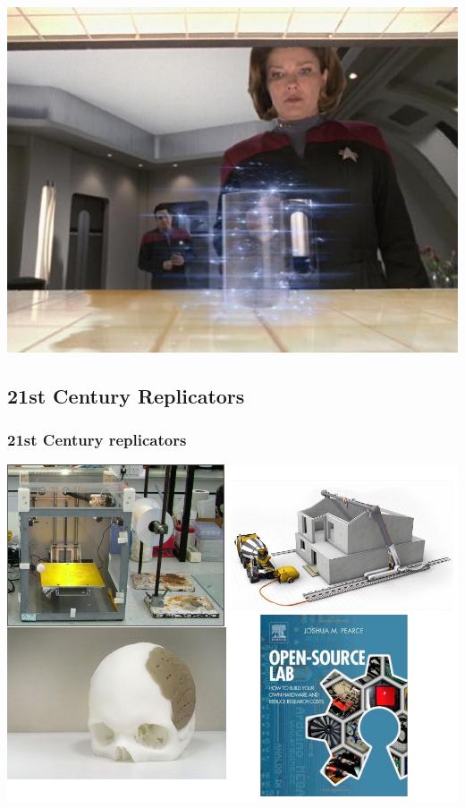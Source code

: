 \documentclass[10pt, compress]{beamer}
\begin{document}
\begin{frame}[fragile]
\begin{center}\includegraphics[scale=0.75]{Coffee_replicates_then_mug.jpg}\end{center}
\end{frame}

\subsection{21st Century Replicators}
\begin{frame}[fragile]
\frametitle{21st Century replicators}
\begin{center}\includegraphics[width=.9\textwidth]{fig1.png}\end{center}
\end{frame}
\end{document}
